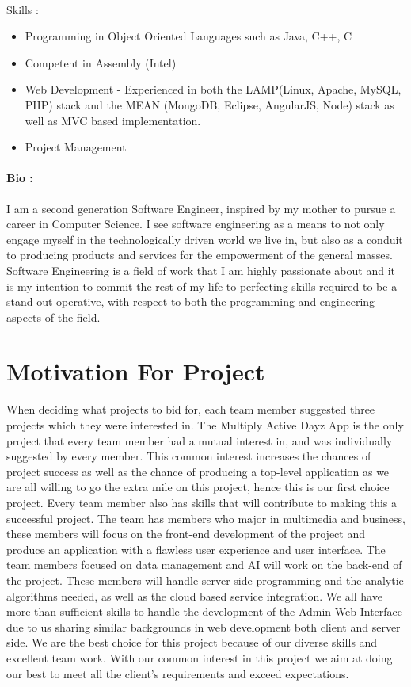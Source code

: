 \documentclass[11pt]{article}
\begin{document}
\paragraph{}Skills :
\begin{itemize}
\item Programming in Object Oriented Languages such as Java, C++, C
\item Competent in Assembly (Intel)
\item Web Development - Experienced in both the LAMP(Linux, Apache, MySQL, PHP) stack and the MEAN (MongoDB, Eclipse, AngularJS, Node) stack as well as MVC based implementation.
\item Project Management
\end{itemize}
\paragraph{Bio :}I am a second generation Software Engineer, inspired by my mother to pursue a career in Computer Science. I see software engineering as a means to not only engage myself in the technologically driven world we live in, but also as a conduit to producing products and services for the empowerment of the general masses. Software Engineering is a field of work that I am highly passionate about and it is my intention to commit the rest of my life to perfecting skills required to be a stand out operative, with respect to both the programming and engineering aspects of the field.

\section{Motivation For Project}
When deciding what projects to bid for, each team member suggested three projects which they were interested in. The Multiply Active Dayz App is the only project that every team member had a mutual interest in, and was individually suggested by every member. This common interest increases the chances of project success as well as the chance of producing a top-level application as we are all willing to go the extra mile on this project, hence this is our first choice project.
\newline
\newline Every team member also has skills that will contribute to making this a successful project. The team has members who major in multimedia and business, these members will focus on the front-end development of the project and produce an application with a flawless user experience and user interface. The team members focused on data management and AI will work on the back-end of the project. These members will handle server side programming and the analytic algorithms needed, as well as the cloud based service integration. We all have more than sufficient skills to handle the development of the Admin Web Interface due to us sharing similar backgrounds in web development both client and server side. 
\newline
\newline We are the best choice for this project because of our diverse skills and excellent team work. With our common interest in this project we aim at doing our best to meet all the client's requirements and exceed expectations.
\end{document}

